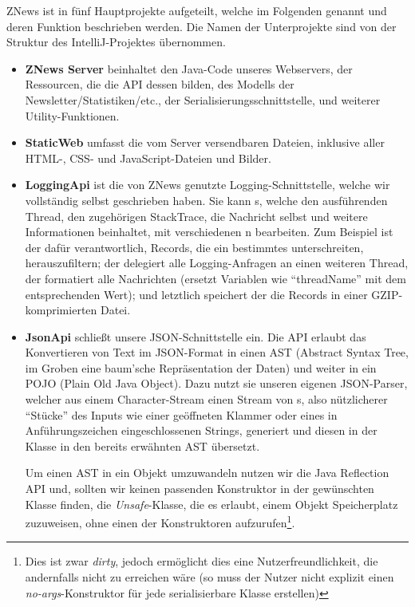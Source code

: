 ZNews ist in fünf Hauptprojekte aufgeteilt,
welche im Folgenden genannt und deren Funktion beschrieben werden.
Die Namen der Unterprojekte sind von der Struktur des IntelliJ-Projektes übernommen.

\begin{itemize}
    \item \textbf{ZNews Server}
    beinhaltet den Java-Code unseres Webservers,
    der Ressourcen, die die API dessen bilden,
    des Modells der Newsletter/Statistiken/etc.,
    der Serialisierungsschnittstelle,
    und weiterer Utility-Funktionen.

    \item \textbf{StaticWeb}
    umfasst die vom Server versendbaren Dateien,
    inklusive aller HTML-, CSS- und JavaScript-Dateien und Bilder.

    \item \textbf{LoggingApi}
    ist die von ZNews genutzte Logging-Schnittstelle,
    welche wir vollständig selbst geschrieben haben.
    Sie kann s,
    welche den ausführenden Thread, den zugehörigen StackTrace,
    die Nachricht selbst und weitere Informationen beinhaltet,
    mit verschiedenen n bearbeiten.
    Zum Beispiel ist der  dafür verantwortlich,
    Records, die ein bestimmtes  unterschreiten,
    herauszufiltern;
    der  delegiert alle Logging-Anfragen an einen weiteren Thread,
    der  formatiert alle Nachrichten
    (ersetzt Variablen wie ``{threadName}'' mit dem entsprechenden Wert);
    und letztlich speichert der  die Records in einer GZIP-komprimierten Datei.

    \item \textbf{JsonApi}
    schließt unsere JSON-Schnittstelle ein.
    Die API erlaubt das Konvertieren von Text im JSON-Format
    in einen AST (Abstract Syntax Tree, im Groben eine baum'sche Repräsentation der Daten)
    und weiter in ein POJO (Plain Old Java Object).
    Dazu nutzt sie unseren eigenen JSON-Parser,
    welcher aus einem Character-Stream einen Stream von s,
    also nützlicherer ``Stücke'' des Inputs
    wie einer geöffneten Klammer oder eines in Anführungszeichen eingeschlossenen Strings,
    generiert
    und diesen in der Klasse  in den bereits erwähnten AST übersetzt.

    Um einen AST in ein Objekt umzuwandeln nutzen wir die Java Reflection API
    und, sollten wir keinen passenden Konstruktor in der gewünschten Klasse finden,
    die \emph{Unsafe}-Klasse, die es erlaubt,
    einem Objekt Speicherplatz zuzuweisen,
    ohne einen der Konstruktoren aufzurufen\footnote{%
    Dies ist zwar \emph{dirty},
    jedoch ermöglicht dies eine Nutzerfreundlichkeit,
    die andernfalls nicht zu erreichen wäre
    (so muss der Nutzer nicht explizit einen \emph{no-args}-Konstruktor für jede serialisierbare Klasse erstellen)}.


\end{itemize}
